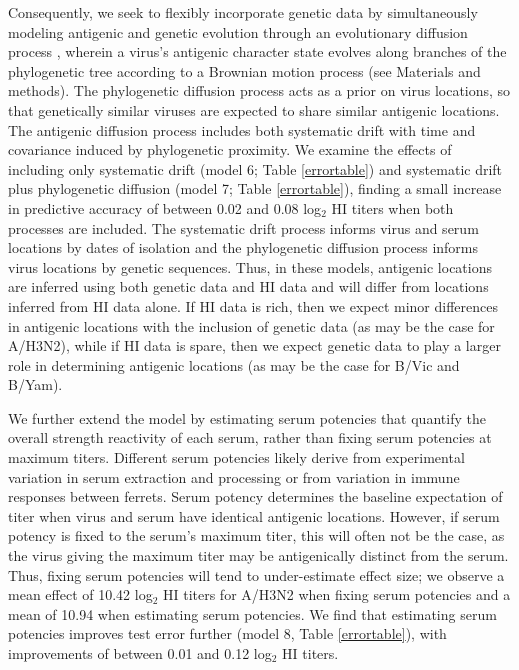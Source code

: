 \documentclass[11pt,oneside,letterpaper]{article}
\begin{document}
Consequently, we seek to flexibly incorporate genetic data by simultaneously modeling antigenic and genetic evolution through an evolutionary diffusion process \cite{Lemey10}, wherein a virus's antigenic character state evolves along branches of the phylogenetic tree according to a Brownian motion process (see Materials and methods).
The phylogenetic diffusion process acts as a prior on virus locations, so that genetically similar viruses are expected to share similar antigenic locations.
The antigenic diffusion process includes both systematic drift with time and covariance induced by phylogenetic proximity.
We examine the effects of including only systematic drift (model 6; Table \ref{errortable}) and systematic drift plus phylogenetic diffusion (model 7; Table \ref{errortable}), finding a small increase in predictive accuracy of between 0.02 and 0.08 log$_2$ HI titers when both processes are included.
The systematic drift process informs virus and serum locations by dates of isolation and the phylogenetic diffusion process informs virus locations by genetic sequences.
Thus, in these models, antigenic locations are inferred using both genetic data and HI data and will differ from locations inferred from HI data alone.
If HI data is rich, then we expect minor differences in antigenic locations with the inclusion of genetic data (as may be the case for A/H3N2), while if HI data is spare, then we expect genetic data to play a larger role in determining antigenic locations (as may be the case for B/Vic and B/Yam).

We further extend the model by estimating serum potencies that quantify the overall strength reactivity of each serum, rather than fixing serum potencies at maximum titers.
Different serum potencies likely derive from experimental variation in serum extraction and processing or from variation in immune responses between ferrets.
Serum potency determines the baseline expectation of titer when virus and serum have identical antigenic locations.
However, if serum potency is fixed to the serum's maximum titer, this will often not be the case, as the virus giving the maximum titer may be antigenically distinct from the serum.
Thus, fixing serum potencies will tend to under-estimate effect size; we observe a mean effect of 10.42 log$_2$ HI titers for A/H3N2 when fixing serum potencies and a mean of 10.94 when estimating serum potencies.
We find that estimating serum potencies improves test error further (model 8, Table \ref{errortable}), with improvements of between 0.01 and 0.12 log$_2$ HI titers.
\end{document}
